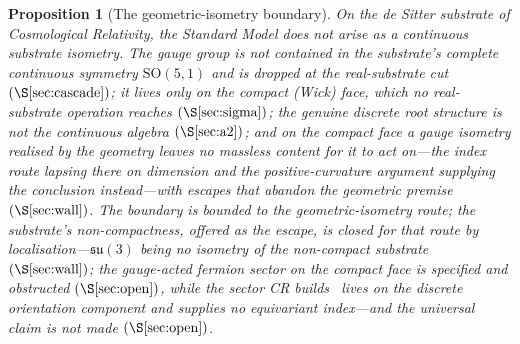 \documentclass[11pt]{article}
\theoremstyle{plain}
\newtheorem{proposition}{Proposition}
\theoremstyle{remark}
\newcommand{\su}{\mathfrak{su}}
\newcommand{\SO}{\mathrm{SO}}
\begin{document}
\begin{proposition}[The geometric-isometry boundary]\label{prop:boundary}
On the de Sitter substrate of Cosmological Relativity, the Standard Model does not arise as a continuous substrate isometry. The gauge group is not contained in the substrate's complete continuous symmetry $\SO(5,1)$ and is dropped at the real-substrate cut $(\S\ref{sec:cascade})$; it lives only on the compact (Wick) face, which no real-substrate operation reaches $(\S\ref{sec:sigma})$; the genuine discrete root structure is not the continuous algebra $(\S\ref{sec:a2})$; and on the compact face a gauge isometry realised by the geometry leaves no massless content for it to
act on---the index route lapsing there on dimension and the positive-curvature argument supplying the
conclusion instead---with escapes that abandon the geometric premise $(\S\ref{sec:wall})$. The boundary is bounded to the geometric-isometry route; the substrate's non-compactness, offered as the escape, is closed for that route by localisation---$\su(3)$ being no isometry of the non-compact substrate $(\S\ref{sec:wall})$; the gauge-acted fermion sector on the compact face is specified and obstructed $(\S\ref{sec:open})$, while the sector CR builds~\cite{JanzenMatter} lives on the discrete orientation component and supplies no equivariant index---and the universal claim is not made $(\S\ref{sec:open})$.
\end{proposition}
\end{document}
